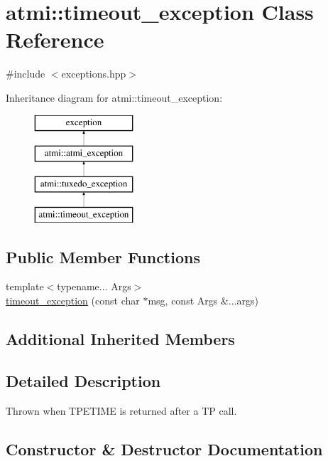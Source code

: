 \hypertarget{classatmi_1_1timeout__exception}{}\section{atmi\+:\+:timeout\+\_\+exception Class Reference}
\label{classatmi_1_1timeout__exception}


{\ttfamily \#include $<$exceptions.\+hpp$>$}

Inheritance diagram for atmi\+:\+:timeout\+\_\+exception\+:\begin{figure}[H]
\begin{center}
\leavevmode
\includegraphics[height=4.000000cm]{classatmi_1_1timeout__exception}
\end{center}
\end{figure}
\subsection*{Public Member Functions}
\begin{DoxyCompactItemize}
\item 
{\footnotesize template$<$typename... Args$>$ }\\\hyperlink{classatmi_1_1timeout__exception_a8fe65e08189bb4d6cbcd63bbfdb53a2b}{timeout\+\_\+exception} (const char $\ast$msg, const Args \&...args)
\end{DoxyCompactItemize}
\subsection*{Additional Inherited Members}


\subsection{Detailed Description}
Thrown when T\+P\+E\+T\+I\+ME is returned after a TP call. 

\subsection{Constructor \& Destructor Documentation}
